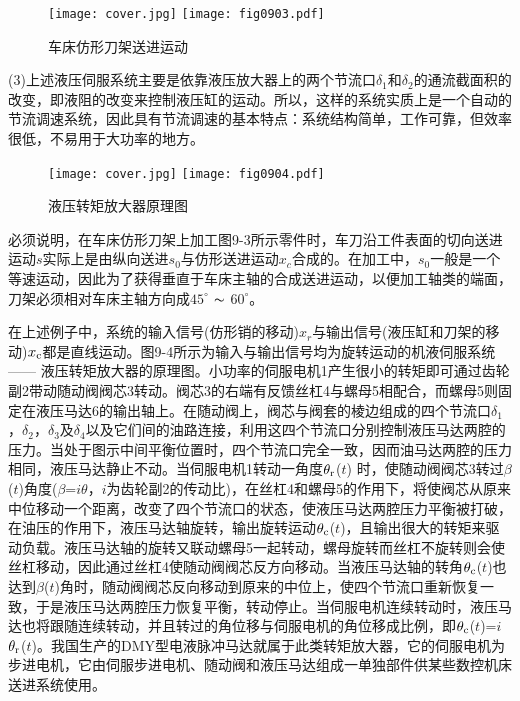 \begin{figure}
\centering
\ifOpenSource
\texttt{[image: cover.jpg]}
\else
\texttt{[image: fig0903.pdf]}
\fi
\caption{车床仿形刀架送进运动}
\label{fig:fig0903}
\end{figure}

(3)上述液压伺服系统主要是依靠液压放大器上的两个节流口$\delta_1$和$\delta_2$的通流截面积的改变，即液阻的改变来控制液压缸的运动。所以，这样的系统实质上是一个自动的节流调速系统，因此具有节流调速的基本特点：系统结构简单，工作可靠，但效率很低，不易用于大功率的地方。

\begin{figure}
\centering
\ifOpenSource
\texttt{[image: cover.jpg]}
\else
\texttt{[image: fig0904.pdf]}
\fi
\caption{液压转矩放大器原理图}
\label{fig:fig0904}
\end{figure}

    必须说明，在车床仿形刀架上加工图9-3所示零件时，车刀沿工件表面的切向送进运动$s$实际上是由纵向送进$s_0$与仿形送进运动$x_c$合成的。在加工中，$s_0$一般是一个等速运动，因此为了获得垂直于车床主轴的合成送进运动，以便加工轴类的端面，刀架必须相对车床主轴方向成$45^{\circ}$ $\thicksim$ $60^{\circ}$。

    在上述例子中，系统的输入信号(仿形销的移动)$x_r$与输出信号(液压缸和刀架的移动)$x_{\rm c}$都是直线运动。图9-4所示为输入与输出信号均为旋转运动的机液伺服系统 —— 液压转矩放大器的原理图。小功率的伺服电机1产生很小的转矩即可通过齿轮副2带动随动阀阀芯3转动。阀芯3的右端有反馈丝杠4与螺母5相配合，而螺母5则固定在液压马达6的输出轴上。在随动阀上，阀芯与阀套的棱边组成的四个节流口$\delta_1$，$\delta_2$，$\delta_3$及$\delta_4$以及它们间的油路连接，利用这四个节流口分别控制液压马达两腔的压力。当处于图示中间平衡位置时，四个节流口完全一致，因而油马达两腔的压力相同，液压马达静止不动。当伺服电机1转动一角度$\theta_{\rm r}$($t$) 时，使随动阀阀芯3转过$\beta $($t$)角度($\beta $=$i\theta $，$i$为齿轮副2的传动比)，在丝杠4和螺母5的作用下，将使阀芯从原来中位移动一个距离，改变了四个节流口的状态，使液压马达两腔压力平衡被打破，在油压的作用下，液压马达轴旋转，输出旋转运动$\theta_{\rm c}$($t$)，且输出很大的转矩来驱动负载。液压马达轴的旋转又联动螺母5一起转动，螺母旋转而丝杠不旋转则会使丝杠移动，因此通过丝杠4使随动阀阀芯反方向移动。当液压马达轴的转角$\theta_{\rm c}$($t$)也达到$\beta$($t$)角时，随动阀阀芯反向移动到原来的中位上，使四个节流口重新恢复一致，于是液压马达两腔压力恢复平衡，转动停止。当伺服电机连续转动时，液压马达也将跟随连续转动，并且转过的角位移与伺服电机的角位移成比例，即$\theta_{\rm c}$($t$)=$i$$\theta_{\rm r}$($t$)。我国生产的DMY型电液脉冲马达就属于此类转矩放大器，它的伺服电机为步进电机，它由伺服步进电机、随动阀和液压马达组成一单独部件供某些数控机床送进系统使用。

